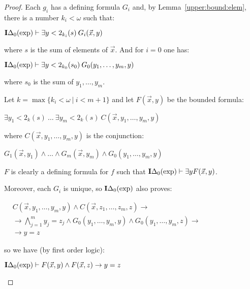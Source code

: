 \documentclass[8pt]{article}
\theoremstyle{definition}
\theoremstyle{definition}
\theoremstyle{definition}
\theoremstyle{definition}
\theoremstyle{definition}
\theoremstyle{definition}
\theoremstyle{definition}
\theoremstyle{definition}
\theoremstyle{definition}
\theoremstyle{definition}
\theoremstyle{definition}
\theoremstyle{definition}
\theoremstyle{definition}
\theoremstyle{question}
\begin{document}
\begin{proof}
  Each $g_i$ has a defining formula $G_i$ and, by Lemma~\ref{upper:bound:elem}, there is a number $k_i < \omega$ such that:
  \begin{center}
    ${\bf I}\Delta_0(\operatorname{exp}) \vdash \exists y < 2_{k_i}(s) \: G_i (\vec{x}, y)$
  \end{center}
  where $s$ is the sum of elements of $\vec{x}$. And for $i = 0$ one has:
  \begin{center}
    ${\bf I}\Delta_0(\operatorname{exp}) \vdash \exists y < 2_{k_0}(s_0) \: G_0 (y_1, \dots, y_m, y)$
  \end{center}
  where $s_0$ is the sum of $y_1, \dots, y_m$.

  Let $k = \max \{ k_i < \omega \: | \: i < m + 1 \}$ and let $F(\vec{x}, y)$ be the bounded formula:
  \begin{center}
    $\exists y_1 < 2_{k}(s) \: \dots \: \exists y_m < 2_{k}(s) \: C(\vec{x}, y_1, \dots, y_m, y)$
  \end{center}
  where $C(\vec{x}, y_1, \dots, y_m, y)$ is the conjunction:
  \begin{center}
    $G_1(\vec{x}, y_1) \land \dots \land G_m(\vec{x}, y_m) \land G_0 (y_1, \dots, y_m, y)$
  \end{center}

  $F$ is clearly a defining formula for $f$ such that ${\bf I}\Delta_0(\operatorname{exp}) \vdash \exists y F(\vec{x}, y)$.

  Moreover, each $G_i$ is unique, so ${\bf I}\Delta_0(\operatorname{exp})$ also proves:

  \vspace{\baselineskip}

  $\begin{array}{lll}
    & C(\vec{x}, y_1, \dots, y_m, y) \land C(\vec{x}, z_1, \dots, z_m, z) \to & \\
    & \to \bigwedge \limits_{j = 1}^m y_j = z_j \land G_0(y_1, \dots, y_m, y) \land G_0(y_1, \dots, y_m, z) \to & \\
    & \to y = z&
  \end{array}$

  \vspace{\baselineskip}

  so we have (by first order logic):
  \begin{center}
    ${\bf I}\Delta_0(\operatorname{exp}) \vdash F(\vec{x}, y) \land F(\vec{x}, z) \to y = z$
  \end{center}


\end{proof}
\end{document}
